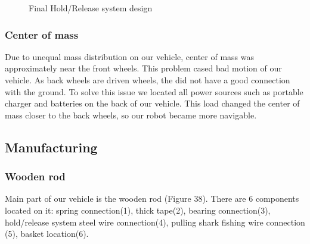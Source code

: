\documentclass{article}
\begin{document}
\begin{figure}[H]
\centering
{}
\caption{Final Hold/Release system design}
\end{figure}

\subsubsection*{Center of mass}
Due to unequal mass distribution on our vehicle, center of mass was approximately near the front wheels. This problem cased bad motion of our vehicle. As back wheels are driven wheels, the did not have a good connection with the ground. To solve this issue we located all power sources such as portable charger and batteries on the back of our vehicle. This load changed the center of mass closer to the back wheels, so our robot became more navigable.
\subsection{Manufacturing}
\subsubsection*{Wooden rod}
Main part of our vehicle is the wooden rod (Figure 38). There are 6 components located on it: spring connection(1), thick tape(2), bearing connection(3), hold/release system steel wire connection(4), pulling shark fishing wire connection (5), basket location(6). 
\end{document}
